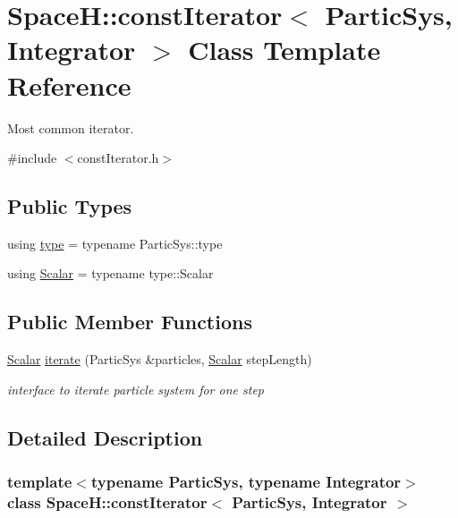 \hypertarget{class_space_h_1_1const_iterator}{}\section{SpaceH\+:\+:const\+Iterator$<$ Partic\+Sys, Integrator $>$ Class Template Reference}
\label{class_space_h_1_1const_iterator}


Most common iterator.  




{\ttfamily \#include $<$const\+Iterator.\+h$>$}

\subsection*{Public Types}
\begin{DoxyCompactItemize}
\item 
using \mbox{\hyperlink{class_space_h_1_1const_iterator_a2a6ca617f92a243149efe6027f1ffea2}{type}} = typename Partic\+Sys\+::type
\item 
using \mbox{\hyperlink{class_space_h_1_1const_iterator_aa8e66385a5d8eeb2a8dc98a2e1c2dbdd}{Scalar}} = typename type\+::\+Scalar
\end{DoxyCompactItemize}
\subsection*{Public Member Functions}
\begin{DoxyCompactItemize}
\item 
\mbox{\hyperlink{class_space_h_1_1const_iterator_aa8e66385a5d8eeb2a8dc98a2e1c2dbdd}{Scalar}} \mbox{\hyperlink{class_space_h_1_1const_iterator_a75d21d7e7427f6c667cd9fc954e99cc6}{iterate}} (Partic\+Sys \&particles, \mbox{\hyperlink{class_space_h_1_1const_iterator_aa8e66385a5d8eeb2a8dc98a2e1c2dbdd}{Scalar}} step\+Length)
\begin{DoxyCompactList}\small\item\em interface to iterate particle system for one step \end{DoxyCompactList}\end{DoxyCompactItemize}


\subsection{Detailed Description}
\subsubsection*{template$<$typename Partic\+Sys, typename Integrator$>$\newline
class Space\+H\+::const\+Iterator$<$ Partic\+Sys, Integrator $>$}

